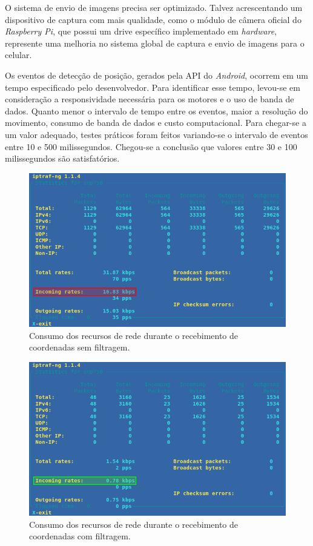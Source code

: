 O sistema de envio de imagens precisa ser optimizado. Talvez acrescentando um dispositivo de captura com mais qualidade, como o módulo de câmera oficial do \textit{Raspberry Pi}, que possui um drive específico implementado em \textit{hardware}, represente uma melhoria no sistema global de captura e envio de imagens para o celular.\par

Os eventos de detecção de posição, gerados pela API do \textit{Android}, ocorrem em um tempo especificado pelo desenvolvedor. Para identificar esse tempo, levou-se em consideração a responsividade necessária para os motores e o uso de banda de dados. Quanto menor o intervalo de tempo entre os eventos, maior a resolução do movimento,  consumo de banda de dados e custo computacional. Para chegar-se a um valor adequado, testes práticos foram feitos variando-se o intervalo de eventos entre 10 e 500 milissegundos. Chegou-se a conclusão que valores entre 30 e 100 milissegundos são satisfatórios.\par

\begin{figure}[H]
	\centering
	\includegraphics[width=1\textwidth]{figuras/consumo_banda_unfiltered.png}
	\caption{Consumo dos recursos de rede durante o recebimento de coordenadas sem filtragem.}
	\label{fig:consumo_banda_coord_unfiltered}
\end{figure}

\begin{figure}[H]
	\centering
	\includegraphics[width=1\textwidth]{figuras/consumo_banda_filtered.png}
	\caption{Consumo dos recursos de rede durante o recebimento de coordenadas com filtragem.}
	\label{fig:consumo_banda_coord_filtered}
\end{figure}

